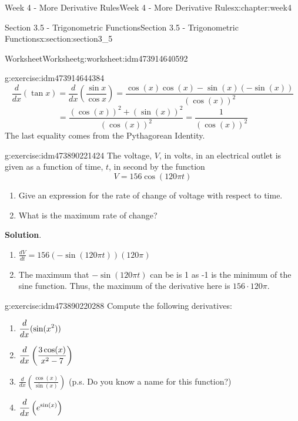 \documentclass[oneside,10pt,]{book}
\newcommand{\blocktitlefont}{\relax}
\numberwithin{equation}{section}
\begin{document}
\begin{chapterptx}{Week 4 - More Derivative Rules}{}{Week 4 - More Derivative Rules}{}{}{x:chapter:week4}
\begin{sectionptx}{Section 3.5 - Trigonometric Functions}{}{Section 3.5 - Trigonometric Functions}{}{}{x:section:section3_5}
\begin{worksheet-subsection}{Worksheet}{}{Worksheet}{}{}{g:worksheet:idm473914640592}
\begin{divisionexercise}{1}{}{}{g:exercise:idm473914644384}
\begin{equation*}
\frac{d}{dx}\left( \tan x \right) = \frac{d}{dx}\left( \frac{\sin x}{\cos x} \right) = \frac{\cos(x)\cos(x)-\sin(x)(-\sin(x))}{(\cos(x))^2}
\end{equation*}
%
\begin{equation*}
= \frac{(\cos(x))^2+(\sin(x))^2}{(\cos(x))^2} = \frac{1}{(\cos(x))^2} 
\end{equation*}
The last equality comes from the Pythagorean Identity.%
\end{divisionexercise}%
\begin{divisionexercise}{2}{}{}{g:exercise:idm473890221424}%
\footnotemark{} The voltage, \(V\), in volts, in an electrical outlet is given as a function of time, \(t\), in second by the function%
\begin{equation*}
V = 156 \cos(120 \pi t) 
\end{equation*}
%
%
\begin{enumerate}[label=(\alph*)]
\item{}Give an expression for the rate of change of voltage with respect to time.%
\item{}What is the maximum rate of change?%
\end{enumerate}
\textbf{\blocktitlefont Solution}.\hypertarget{g:solution:idm473890221680}{}\quad{}%
\begin{enumerate}[label=(\alph*)]
\item{}\(\displaystyle \frac{dV}{dt} = 156(-\sin(120\pi t))(120\pi)\)%
\item{}The maximum that \(-\sin(120 \pi t)\) can be is 1 as -1 is the minimum of the sine function. Thus, the maximum of the derivative here is \(156\cdot 120\pi\).%
\end{enumerate}
\end{divisionexercise}%
%
\begin{divisionexercise}{3}{}{}{g:exercise:idm473890220288}%
Compute the following derivatives:%
%
\begin{enumerate}[label=(\alph*)]
\item{}\(\displaystyle \displaystyle \frac{d}{dx} (\sin(x^2))\)%
\item{}\(\displaystyle \displaystyle\frac{d}{dx} \left( \frac{3\cos(x)}{x^2-7}\right)\)%
\item{}\(\displaystyle\frac{d}{dx} \left( \frac{\cos(x)}{\sin(x)} \right)\)  (p.s. Do you know a name for this function?)%
\item{}\(\displaystyle \displaystyle\frac{d}{dx} \left( e^{\sin(x)} \right)\)%

\end{enumerate}
\end{divisionexercise}
\end{worksheet-subsection}
\end{sectionptx}
\end{chapterptx}
\end{document}
